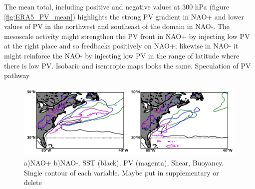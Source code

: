 
The mean total, including positive and negative values at 300 hPa (figure \ref{fig:ERA5_PV_mean}) highlights the strong PV gradient in NAO+ and lower values of PV in the northwest and southeast of the domain in NAO-. The mesoscale activity might strengthen the PV front in NAO+ by injecting low PV at the right place and so feedbacks positively on NAO+; likewise in NAO- it might reinforce the NAO- by injecting low PV in the range of latitude where there is low PV.
Isobaric and isentropic maps looks the same.
Speculation of PV pathway

\begin{figure}[h]
	\centering
	\includegraphics[width=30pc]{Sub_overlay_GS.pdf}
	\caption{a)NAO+ b)NAO-. SST (black), PV (magenta), Shear, Buoyancy. Single contour of each variable. Maybe put in supplementary or delete}
	\label{fig:ERA5_overlay}
\end{figure}





